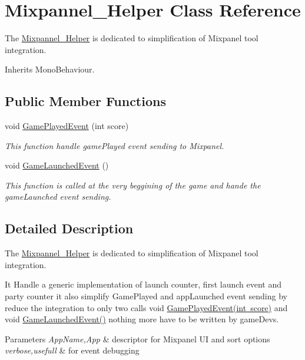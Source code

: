 \hypertarget{class_mixpannel___helper}{}\section{Mixpannel\+\_\+\+Helper Class Reference}
\label{class_mixpannel___helper}


The \mbox{\hyperlink{class_mixpannel___helper}{Mixpannel\+\_\+\+Helper}} is dedicated to simplification of Mixpanel tool integration.  




Inherits Mono\+Behaviour.

\subsection*{Public Member Functions}
\begin{DoxyCompactItemize}
\item 
void \mbox{\hyperlink{class_mixpannel___helper_a0d516d08396ffd740dd7805e1644c458}{Game\+Played\+Event}} (int score)
\begin{DoxyCompactList}\small\item\em This function handle game\+Played event sending to Mixpanel. \end{DoxyCompactList}\item 
void \mbox{\hyperlink{class_mixpannel___helper_a6deb2506716775a1828fd4cff1ffa6b7}{Game\+Launched\+Event}} ()
\begin{DoxyCompactList}\small\item\em This function is called at the very beggining of the game and hande the game\+Launched event sending. \end{DoxyCompactList}\end{DoxyCompactItemize}


\subsection{Detailed Description}
The \mbox{\hyperlink{class_mixpannel___helper}{Mixpannel\+\_\+\+Helper}} is dedicated to simplification of Mixpanel tool integration. 

It Handle a generic implementation of launch counter, first launch event and party counter it also simplify Game\+Played and app\+Launched event sending by reduce the integration to only two calls void \mbox{\hyperlink{class_mixpannel___helper_a0d516d08396ffd740dd7805e1644c458}{Game\+Played\+Event(int score)}} and void \mbox{\hyperlink{class_mixpannel___helper_a6deb2506716775a1828fd4cff1ffa6b7}{Game\+Launched\+Event()}} nothing more have to be written by game\+Devs. 
\begin{DoxyParams}{Parameters}
{\em App\+Name,App} & descriptor for Mixpanel UI and sort options \\
\hline
{\em verbose,usefull} & for event debugging \\
\hline
\end{DoxyParams}


